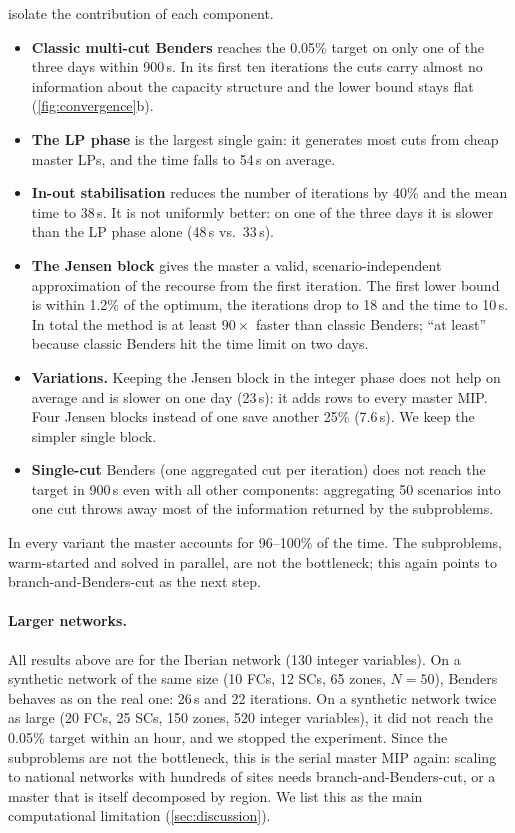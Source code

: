  isolate the contribution of each component.
\begin{itemize}
  \item \textbf{Classic multi-cut Benders} reaches the 0.05\% target on only one of the three days within 900\,s. In its first ten iterations the cuts carry almost no information about the capacity structure and the lower bound stays flat (\cref{fig:convergence}b).
  \item \textbf{The LP phase} is the largest single gain: it generates most cuts from cheap master LPs, and the time falls to 54\,s on average.
  \item \textbf{In-out stabilisation} reduces the number of iterations by 40\% and the mean time to 38\,s. It is not uniformly better: on one of the three days it is slower than the LP phase alone (48\,s vs.\ 33\,s).
  \item \textbf{The Jensen block} gives the master a valid, scenario-independent approximation of the recourse from the first iteration. The first lower bound is within 1.2\% of the optimum, the iterations drop to 18 and the time to 10\,s. In total the method is at least $90\times$ faster than classic Benders; ``at least'' because classic Benders hit the time limit on two days.
  \item \textbf{Variations.} Keeping the Jensen block in the integer phase does not help on average and is slower on one day (23\,s): it adds rows to every master MIP. Four Jensen blocks instead of one save another 25\% (7.6\,s). We keep the simpler single block.
  \item \textbf{Single-cut} Benders (one aggregated cut per iteration) does not reach the target in 900\,s even with all other components: aggregating 50 scenarios into one cut throws away most of the information returned by the subproblems.
\end{itemize}
In every variant the master accounts for 96--100\% of the time. The subproblems, warm-started and solved in parallel, are not the bottleneck; this again points to branch-and-Benders-cut as the next step.

\paragraph{Larger networks.}
All results above are for the Iberian network (130 integer variables). On a synthetic network of the same size (10 FCs, 12 SCs, 65 zones, $N=50$), Benders behaves as on the real one: 26\,s and 22 iterations. On a synthetic network twice as large (20 FCs, 25 SCs, 150 zones, 520 integer variables), it did not reach the 0.05\% target within an hour, and we stopped the experiment. Since the subproblems are not the bottleneck, this is the serial master MIP again: scaling to national networks with hundreds of sites needs branch-and-Benders-cut, or a master that is itself decomposed by region. We list this as the main computational limitation (\cref{sec:discussion}).
